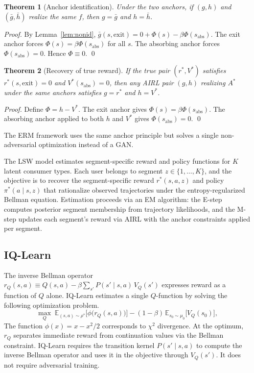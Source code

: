 \documentclass[11pt]{article}
\newtheorem{theorem}{Theorem}
\begin{document}
\begin{theorem}[Anchor identification]\label{thm:anchor}
Under the two anchors, if $(g,h)$ and $(\bar{g},\bar{h})$ realize the same $f$, then $g = \bar{g}$ and $h = \bar{h}$.
\end{theorem}
\begin{proof}
By Lemma~\ref{lem:nonid}, $\bar{g}(s,\text{exit}) = 0 + \Phi(s) - \beta\Phi(s_{\mathrm{abs}})$. The exit anchor forces $\Phi(s) = \beta\Phi(s_{\mathrm{abs}})$ for all $s$. The absorbing anchor forces $\Phi(s_{\mathrm{abs}}) = 0$. Hence $\Phi \equiv 0$. \qed
\end{proof}

\begin{theorem}[Recovery of true reward]\label{thm:recovery}
If the true pair $(r^*, V^*)$ satisfies $r^*(s,\mathrm{exit}) = 0$ and $V^*(s_{\mathrm{abs}}) = 0$, then any AIRL pair $(g,h)$ realizing $A^*$ under the same anchors satisfies $g = r^*$ and $h = V^*$.
\end{theorem}
\begin{proof}
Define $\Phi = h - V^*$. The exit anchor gives $\Phi(s) = \beta\Phi(s_{\mathrm{abs}})$. The absorbing anchor applied to both $h$ and $V^*$ gives $\Phi(s_{\mathrm{abs}}) = 0$. \qed
\end{proof}

The \citet{kang2025} ERM framework uses the same anchor principle but solves a single non-adversarial optimization instead of a GAN.

The LSW model estimates segment-specific reward and policy functions for $K$ latent consumer types. Each user belongs to segment $z \in \{1, \ldots, K\}$, and the objective is to recover the segment-specific reward $r^*(s, a, z)$ and policy $\pi^*(a \mid s, z)$ that rationalize observed trajectories under the entropy-regularized Bellman equation. Estimation proceeds via an EM algorithm: the E-step computes posterior segment membership from trajectory likelihoods, and the M-step updates each segment's reward via AIRL with the anchor constraints applied per segment.

\subsection{IQ-Learn \citep{garg2021}}

The inverse Bellman operator $r_Q(s,a) \equiv Q(s,a) - \beta \sum_{s'} P(s' \mid s,a)\, V_Q(s')$ expresses reward as a function of $Q$ alone. IQ-Learn estimates a single $Q$-function by solving the following optimization problem.
\begin{equation}\label{eq:iq_obj}
\max_Q \;\mathbb{E}_{(s,a) \sim \rho^*}\bigl[\phi\bigl(r_Q(s,a)\bigr)\bigr] - (1-\beta)\,\mathbb{E}_{s_0 \sim \mu_0}\bigl[V_Q(s_0)\bigr],
\end{equation}
The function $\phi(x) = x - x^2/2$ corresponds to $\chi^2$ divergence. At the optimum, $r_Q$ separates immediate reward from continuation values via the Bellman constraint. IQ-Learn requires the transition kernel $P(s' \mid s, a)$ to compute the inverse Bellman operator and uses it in the objective through $V_Q(s')$. It does not require adversarial training.
\end{document}
